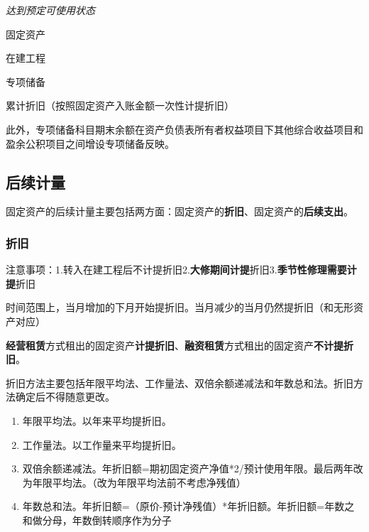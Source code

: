 \documentclass[UTF8,12pt]{ctexart}
\newenvironment{Dr}{%
	\begin{list}{}%
		{
			\setlength{\leftmargin}{2em}
			\setlength{\labelwidth}{2em}
			\setlength{\labelsep}{0pt}
			\setlength{\itemindent}{0pt}
			\setlength{\listparindent}{0pt}
			\setlength{\parsep}{0pt}
			\setlength{\topsep}{0pt}
		}
		\item[\textbf{借：}]
	}{%
	\end{list}
}
\newenvironment{Cr}{%
	\begin{list}{}%
		{
			\setlength{\leftmargin}{2em}
			\setlength{\labelwidth}{2em}
			\setlength{\labelsep}{0pt}
			\setlength{\itemindent}{0pt}
			\setlength{\listparindent}{0pt}
			\setlength{\parsep}{0pt}
			\setlength{\topsep}{0pt}
		}
		\item[\textbf{贷：}]
	}{%
	\end{list}
}
\numberwithin{equation}{section} %
\numberwithin{figure}{section}
\numberwithin{table}{section}
\begin{document}
	\textit{达到预定可使用状态}
	
	\begin{Dr}
		固定资产
	\end{Dr}
	\begin{Cr}
		在建工程
	\end{Cr}
	
	\begin{Dr}
		专项储备
	\end{Dr}
	\begin{Cr}
		累计折旧（按照固定资产入账金额一次性计提折旧）
	\end{Cr}
	
	此外，专项储备科目期末余额在资产负债表所有者权益项目下其他综合收益项目和盈余公积项目之间增设专项储备反映。
	
	
	
	\subsection{后续计量}
	固定资产的后续计量主要包括两方面：固定资产的\textbf{折旧}、固定资产的\textbf{后续支出}。
	
	\subsubsection{折旧}
	注意事项：1.转入在建工程后不计提折旧2.\textbf{大修期间计提}折旧3.\textbf{季节性修理需要计提}折旧
	
	时间范围上，当月增加的下月开始提折旧。当月减少的当月仍然提折旧（和无形资产对应）
	
	\textbf{经营租赁}方式租出的固定资产\textbf{计提折旧}、\textbf{融资租赁}方式租出的固定资产\textbf{不计提折旧}。
	
	折旧方法主要包括年限平均法、工作量法、双倍余额递减法和年数总和法。折旧方法确定后不得随意更改。
	
	\begin{enumerate}
		\item 年限平均法。以年来平均提折旧。
		
		\item 工作量法。以工作量来平均提折旧。
		
		\item 双倍余额递减法。年折旧额=期初固定资产净值*2/预计使用年限。最后两年改为年限平均法。（改为年限平均法前不考虑净残值）
		
		\item 年数总和法。年折旧额=（原价-预计净残值）*年折旧额。年折旧额=年数之和做分母，年数倒转顺序作为分子
	\end{enumerate}
	
\end{document}
